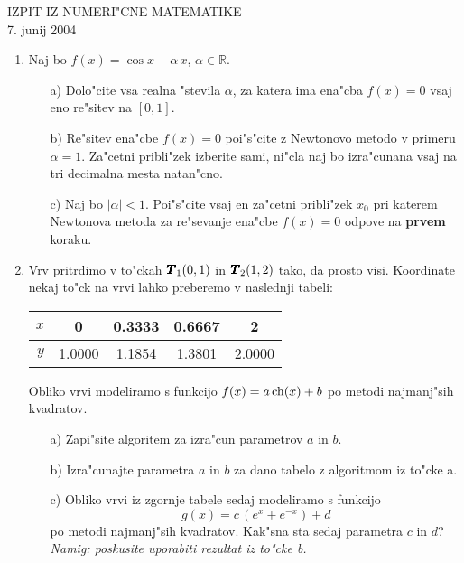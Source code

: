 \documentclass[12pt,a4paper]{article}
\def\RR{\mathbb{R}}
\def\bfm#1{{\dimen0=.01em\dimen1=.009em\makebold{$#1$}}}
\def\makebold#1{\mathord{\setbox0=\hbox{#1}%
       \copy0\kern-\wd0%
       \raise\dimen1\copy0\kern-\wd0%
       {\advance\dimen1 by \dimen1\raise\dimen1\copy0}\kern-\wd0%
       \kern\dimen0\raise\dimen1\copy0\kern-\wd0%
       {\advance\dimen1 by \dimen1\raise\dimen1\copy0}\kern-\wd0%
       \kern\dimen0\raise\dimen1\copy0\kern-\wd0%
       {\advance\dimen1 by \dimen1\raise\dimen1\copy0}\kern-\wd0%
       \kern\dimen0\raise\dimen1\copy0\kern-\wd0%
       \kern\dimen0\box0}}
\begin{document}
\begin{center}
  IZPIT IZ NUMERI"CNE MATEMATIKE\\
  7. junij 2004
\end{center}
\vspace{1cm}

\begin{enumerate}
  \item Naj bo $f(x)=\cos{x}-\alpha\,x$, $\alpha\in\RR$.
  \begin{itemize}
    \item[a)] Dolo"cite vsa realna "stevila $\alpha$, za katera
      ima ena"cba $f(x)=0$ vsaj eno re"sitev na $[0,1]$.
    \item[b)] Re"sitev ena"cbe $f(x)=0$ poi"s"cite z Newtonovo metodo
      v primeru $\alpha=1$.
      Za"cetni pribli"zek izberite sami, ni"cla naj bo izra"cunana
      vsaj na tri decimalna mesta natan"cno.
    \item[c)] Naj bo $|\alpha|<1$. Poi"s"cite vsaj en za"cetni pribli"zek
      $x_0$ pri katerem Newtonova metoda za re"sevanje ena"cbe
      $f(x)=0$ odpove na {\bf prvem} koraku.  
  \end{itemize}
  \item Vrv pritrdimo v to"ckah $\bfm{T}_1(0,1)$ in $\bfm{T}_2(1,2)$ tako,
    da prosto visi. Koordinate nekaj to"ck na vrvi lahko 
    preberemo v naslednji tabeli:
    \begin{center}
    \begin{tabular}{r|cccc}
        $x$ & 0 & 0.3333 & 0.6667 & 2\\ \hline
        $y$ & 1.0000 & 1.1854 & 1.3801 & 2.0000
      \end{tabular}
    \end{center}
    
    Obliko vrvi modeliramo s funkcijo $f(x)=a\,{\rm ch}(x)+b$ po metodi
    najmanj"sih kvadratov.
    \begin{itemize}
     \item[a)] Zapi"site algoritem za izra"cun parametrov $a$ in $b$.
     \item[b)] Izra"cunajte parametra $a$ in $b$ za dano tabelo z 
       algoritmom iz to"cke a.
     \item[c)] Obliko vrvi iz zgornje tabele sedaj modeliramo s funkcijo 
       $$g(x)=c\,(e^{x}+e^{-x})+d$$ 
       po metodi najmanj"sih kvadratov.
       Kak"sna sta sedaj parametra $c$ in $d$?\\
       {\sl Namig: poskusite uporabiti rezultat iz to"cke b.}
    \end{itemize}
\end{enumerate}
\end{document}
